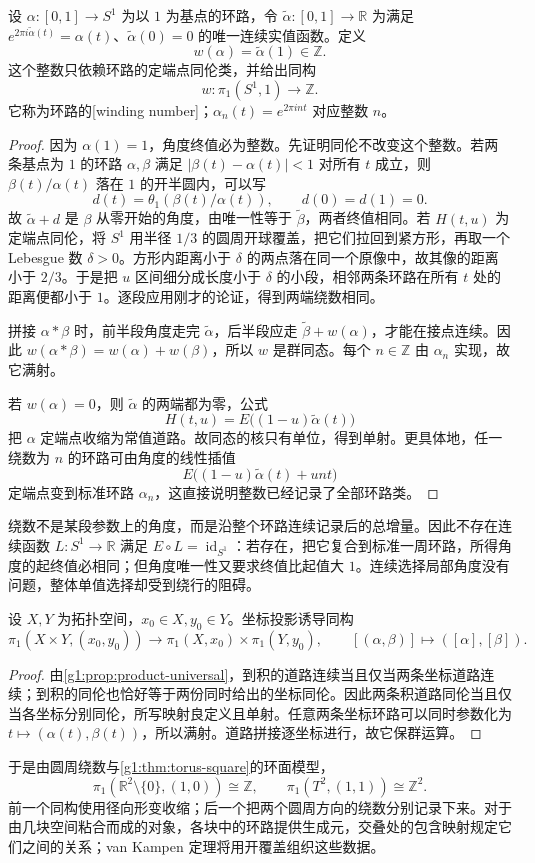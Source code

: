 \begin{theorem}\label{g1:thm:circle-fundamental}
	设 \(\alpha:[0,1]\to S^1\) 为以 \(1\) 为基点的环路，令 \(\widetilde\alpha:[0,1]\to\mathbb R\) 为满足 \(e^{2\pi i\widetilde\alpha(t)}=\alpha(t)\)、\(\widetilde\alpha(0)=0\) 的唯一连续实值函数。定义
	\[
		w(\alpha)=\widetilde\alpha(1)\in\mathbb Z.
	\]
	这个整数只依赖环路的定端点同伦类，并给出同构
	\[
		w:\pi_1(S^1,1)\longrightarrow\mathbb Z.
	\]
	它称为环路的[winding number]；\(\alpha_n(t)=e^{2\pi int}\) 对应整数 \(n\)。
\end{theorem}
\begin{proof}
	因为 \(\alpha(1)=1\)，角度终值必为整数。先证明同伦不改变这个整数。若两条基点为 \(1\) 的环路 \(\alpha,\beta\) 满足 \(|\beta(t)-\alpha(t)|<1\) 对所有 \(t\) 成立，则 \(\beta(t)/\alpha(t)\) 落在 \(1\) 的开半圆内，可以写
	\[
		d(t)=\theta_1(\beta(t)/\alpha(t)),\qquad d(0)=d(1)=0.
	\]
	故 \(\widetilde\alpha+d\) 是 \(\beta\) 从零开始的角度，由唯一性等于 \(\widetilde\beta\)，两者终值相同。若 \(H(t,u)\) 为定端点同伦，将 \(S^1\) 用半径 \(1/3\) 的圆周开球覆盖，把它们拉回到紧方形，再取一个 Lebesgue 数 \(\delta>0\)。方形内距离小于 \(\delta\) 的两点落在同一个原像中，故其像的距离小于 \(2/3\)。于是把 \(u\) 区间细分成长度小于 \(\delta\) 的小段，相邻两条环路在所有 \(t\) 处的距离便都小于 \(1\)。逐段应用刚才的论证，得到两端绕数相同。

	拼接 \(\alpha*\beta\) 时，前半段角度走完 \(\widetilde\alpha\)，后半段应走 \(\widetilde\beta+w(\alpha)\)，才能在接点连续。因此 \(w(\alpha*\beta)=w(\alpha)+w(\beta)\)，所以 \(w\) 是群同态。每个 \(n\in\mathbb Z\) 由 \(\alpha_n\) 实现，故它满射。

	若 \(w(\alpha)=0\)，则 \(\widetilde\alpha\) 的两端都为零，公式
	\[
		H(t,u)=E\bigl((1-u)\widetilde\alpha(t)\bigr)
	\]
	把 \(\alpha\) 定端点收缩为常值道路。故同态的核只有单位，得到单射。更具体地，任一绕数为 \(n\) 的环路可由角度的线性插值
	\[
		E\bigl((1-u)\widetilde\alpha(t)+unt\bigr)
	\]
	定端点变到标准环路 \(\alpha_n\)，这直接说明整数已经记录了全部环路类。
\end{proof}

绕数不是某段参数上的角度，而是沿整个环路连续记录后的总增量。因此不存在连续函数 \(L:S^1\rightarrow\mathbb R\) 满足 \(E\circ L=\operatorname{id}_{S^1}\)：若存在，把它复合到标准一周环路，所得角度的起终值必相同；但角度唯一性又要求终值比起值大 \(1\)。连续选择局部角度没有问题，整体单值选择却受到绕行的阻碍。

\begin{proposition}\label{g1:prop:product-fundamental}
	设 \(X,Y\) 为拓扑空间，\(x_0\in X,y_0\in Y\)。坐标投影诱导同构
	\[
		\pi_1(X\times Y,(x_0,y_0))
		\longrightarrow\pi_1(X,x_0)\times\pi_1(Y,y_0),\qquad
		[(\alpha,\beta)]\longmapsto([\alpha],[\beta]).
	\]
\end{proposition}
\begin{proof}
	由\cref{g1:prop:product-universal}，到积的道路连续当且仅当两条坐标道路连续；到积的同伦也恰好等于两份同时给出的坐标同伦。因此两条积道路同伦当且仅当各坐标分别同伦，所写映射良定义且单射。任意两条坐标环路可以同时参数化为 \(t\mapsto(\alpha(t),\beta(t))\)，所以满射。道路拼接逐坐标进行，故它保群运算。
\end{proof}

于是由圆周绕数与\cref{g1:thm:torus-square}的环面模型，
\[
	\pi_1(\mathbb R^2\setminus\{0\},(1,0))\cong\mathbb Z,\qquad
	\pi_1(T^2,(1,1))\cong\mathbb Z^2.
\]
前一个同构使用径向形变收缩；后一个把两个圆周方向的绕数分别记录下来。对于由几块空间粘合而成的对象，各块中的环路提供生成元，交叠处的包含映射规定它们之间的关系；van Kampen 定理将用开覆盖组织这些数据。
